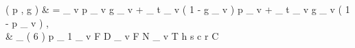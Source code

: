  ( p , g ) & =  { \sum _ { v } p _ { v } g _ { v } + \alpha _ { t } \sum _ { v } ( 1 - g _ { v } ) p _ { v } + \beta _ { t } \sum _ { v } g _ { v } ( 1 - p _ { v } ) } , \\  & \sum _ { ( 6 ) } p _ { 1 } \varrho _ { v }  \text { } F D _ { v } \text {, } \text { } F N _ { v } \text {, } \text { } \text { } \text { } T h s c r { C }

